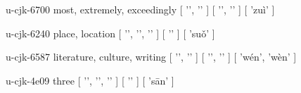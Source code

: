 \begin{multicols}{2}
\lettrine[lines=3]{\cjkgGlue{}}{}\begin{minipage}{0.8\linewidth} u-cjk-6700  most, extremely, exceedingly  [ '\cjkgGlue{}', '\cjkgGlue{}' ]  [ '\cjkgGlue{}', '\cjkgGlue{}' ]  [ 'zuì' ] \end{minipage}

\lettrine[lines=3]{\cjkgGlue{}}{}\begin{minipage}{0.8\linewidth} u-cjk-6240  place, location  [ '\cjkgGlue{}', '\cjkgGlue{}', '\cjkgGlue{}' ]  [ '\cjkgGlue{}' ]  [ 'suǒ' ] \end{minipage}

\lettrine[lines=3]{\cjkgGlue{}}{}\begin{minipage}{0.8\linewidth} u-cjk-6587  literature, culture, writing  [ '\cjkgGlue{}', '\cjkgGlue{}' ]  [ '\cjkgGlue{}', '\cjkgGlue{}' ]  [ 'wén', 'wèn' ] \end{minipage}

\lettrine[lines=3]{\cjkgGlue{}}{}\begin{minipage}{0.8\linewidth} u-cjk-4e09  three  [ '\cjkgGlue{}', '\cjkgGlue{}', '\cjkgGlue{}' ]  [ '\cjkgGlue{}' ]  [ 'sān' ] \end{minipage}


\end{multicols}

